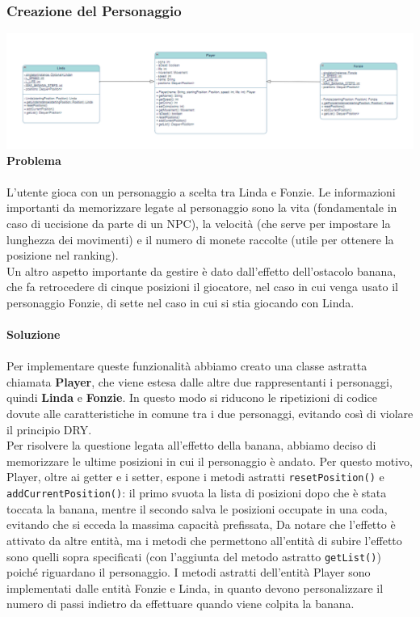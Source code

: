 \documentclass[12pt, letterpaper]{article}
\begin{document}
        \subsubsection{Creazione del Personaggio}
            \includegraphics[width=1\textwidth]{player.png}
            \\
            \textbf{Problema}
            \\ \\
            L'utente gioca con un personaggio a scelta tra Linda e Fonzie. Le informazioni importanti da memorizzare legate al personaggio sono la vita (fondamentale in caso di uccisione da parte di un NPC), la velocità (che serve per impostare la lunghezza dei movimenti) e il numero di monete raccolte (utile per ottenere la posizione nel ranking). \\
            Un altro aspetto importante da gestire è dato dall'effetto dell'ostacolo banana, che fa retrocedere di cinque posizioni il giocatore, nel caso in cui venga usato il personaggio Fonzie, di sette nel caso in cui si stia giocando con Linda.
            \\ \\
            \textbf{Soluzione}
            \\ \\
            Per implementare queste funzionalità abbiamo creato una classe astratta chiamata \textbf{Player}, che viene estesa dalle altre due rappresentanti i personaggi, quindi \textbf{Linda} e \textbf{Fonzie}. In questo modo si riducono le ripetizioni di codice dovute alle caratteristiche in comune tra i due personaggi, evitando così di violare il principio DRY.\\
            Per risolvere la questione legata all'effetto della banana, abbiamo deciso di memorizzare le ultime posizioni in cui il personaggio è andato. Per questo motivo, Player, oltre ai getter e i setter, espone i metodi astratti \verb|resetPosition()| e \verb|addCurrentPosition()|: il primo svuota la lista di posizioni dopo che è stata toccata la banana, mentre il secondo salva le posizioni occupate in una coda,  evitando che si ecceda la massima capacità prefissata, Da notare che l'effetto è attivato da altre entità, ma i metodi che permettono all'entità di subire l'effetto sono quelli sopra specificati (con l'aggiunta del metodo astratto \verb|getList()|) poiché riguardano il personaggio. I metodi astratti dell'entità Player sono implementati dalle entità Fonzie e Linda, in quanto devono personalizzare il numero di passi indietro da effettuare quando viene colpita la banana. 
\end{document}
